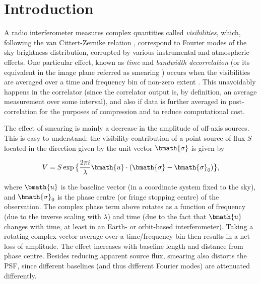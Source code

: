 \documentclass[useAMS,usenatbib]{mn2e}
\newcommand{\ATM}[1]{\textcolor{blue}{{\bf Marcellin: #1}}}
\newcommand{\GSF}[1]{\textcolor{red}{{\bf GSF: #1}}}
\begin{document}
\section[]{Introduction}

% 
% 
A radio interferometer measures complex quantities called \emph{visibilities}, which, following the van Cittert-Zernike 
relation \citep{thompson1999fundamentals,thompson2001fundamentals}, correspond to Fourier modes of the sky brightness distribution, corrupted by various instrumental 
and atmospheric effects. 
One particular effect, known as \emph{time} and \emph{bandwidth decorrelation} (or its equivalent in the image plane referred as smearing ) occurs 
when the visibilities are averaged over a time and frequency bin of non-zero extent \citep{bridle1989wide,bridle1999bandwidth}. This unavoidably happens in the correlator 
(since the correlator output is, by definition, an average measurement over some interval), and also if data is further 
averaged in post-correlation for the purposes of compression and to reduce computational cost.

The effect of smearing is mainly a decrease in the amplitude of off-axis sources. This is easy to understand: the visibility contribution of a point source of flux $S$ located in the direction given by the unit vector $\bmath{\sigma}$ is given by

\begin{equation}
V = S \exp \big \{  \frac{2\pi i}{\lambda} \bmath{u}\cdot(\bmath{\sigma}-\bmath{\sigma}_0) \big \},
\end{equation}

\noindent where $\bmath{u}$ is the baseline vector (in a coordinate system fixed to the sky), and $\bmath{\sigma}_0$ is the phase centre (or fringe stopping centre) of the observation.
The complex phase term above rotates as a function of frequency (due to the inverse scaling with $\lambda$) and time (due to
the fact that $\bmath{u}$ changes with time, at least in an Earth- or orbit-based interferometer). 
Taking a rotating complex vector average over a time/frequency bin then results  in a net loss of amplitude. The effect increases 
with baseline length and distance from phase centre. Besides reducing apparent source flux, smearing also distorts the PSF, since different baselines (and thus different Fourier modes) are attenuated differently.
\end{document}
